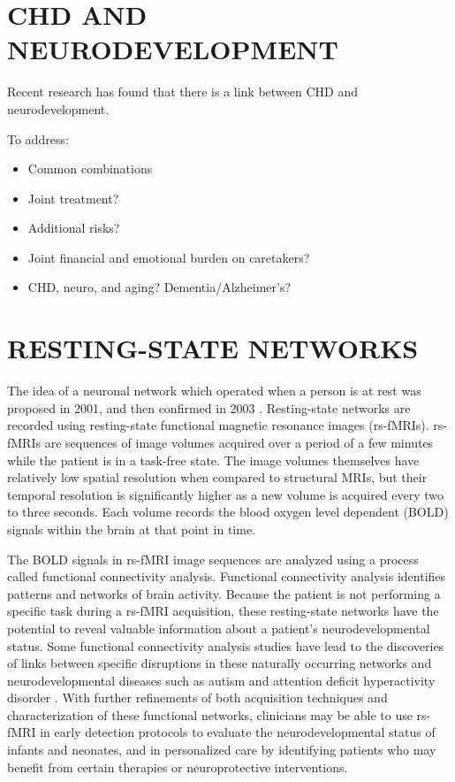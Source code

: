 \section{CHD AND NEURODEVELOPMENT}

Recent research has found that there is a link between CHD and neurodevelopment.

To address:
\begin{itemize}
\item Common combinations
\item Joint treatment?
\item Additional risks?
\item Joint financial and emotional burden on caretakers? 
\item CHD, neuro, and aging? Dementia/Alzheimer's?
\end{itemize}

\section{RESTING-STATE NETWORKS}

The idea of a neuronal network which operated when a person is at rest was proposed in 2001, and then confirmed in 2003 \cite{Raichle2001} \cite{Greicius2003}. Resting-state networks are recorded using resting-state functional magnetic resonance images (rs-fMRIs). rs-fMRIs are sequences of image volumes acquired over a period of a few minutes while the patient is in a task-free state. The image volumes themselves have relatively low spatial resolution when compared to structural MRIs, but their temporal resolution is significantly higher as a new volume is acquired every two to three seconds. Each volume records the blood oxygen level dependent (BOLD) signals within the brain at that point in time. 

The BOLD signals in rs-fMRI image sequences are analyzed using a process called functional connectivity analysis. Functional connectivity analysis identifies patterns and networks of brain activity. Because the patient is not performing a specific task during a rs-fMRI acquisition, these resting-state networks have the potential to reveal valuable information about a patient's neurodevelopmental status. Some functional connectivity analysis studies have lead to the discoveries of links between specific disruptions in these naturally occurring networks and neurodevelopmental diseases such as autism and attention deficit hyperactivity disorder \cite{Assaf2010} \cite{Zang2007}. With further refinements of both acquisition techniques and characterization of these functional networks, clinicians may be able to use rs-fMRI in early detection protocols to evaluate the neurodevelopmental status of infants and neonates, and in personalized care by identifying patients who may benefit from certain therapies or neuroprotective interventions.
